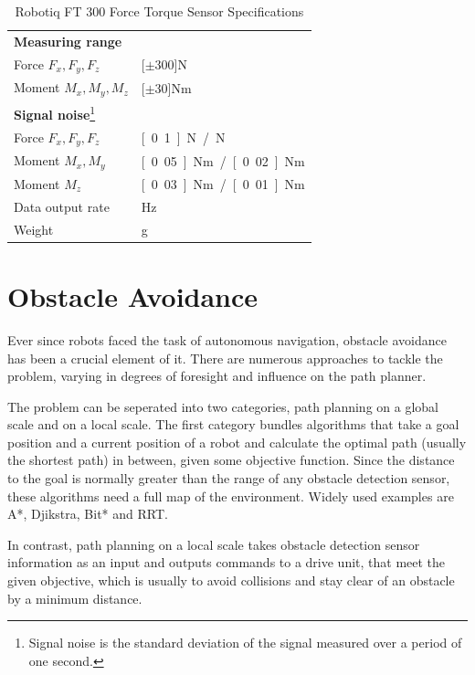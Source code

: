 \begin{savenotes}
\begin{table}[h]
\begin{center}
 \caption{Robotiq FT 300 Force Torque Sensor Specifications}\vspace{1ex}
 \label{tab:robotiq_ft}
 \begin{tabular}{ll}
 \hline
 \textbf{Measuring range} & \\
 Force $F_x, F_y, F_z$ & \unit[$\pm 300$]{N} \\
 Moment $M_x, M_y, M_z$ & \unit[$\pm 30$]{Nm} \\ \hline
 \textbf{Signal noise}\footnote{Signal noise is the standard deviation of the signal measured over a period of one second.} &\\
 Force $F_x, F_y, F_z$ & \unit[0.1]{N} / \unit[1]{N} \\
 Moment $M_x, M_y$ & \unit[0.05]{Nm} / \unit[0.02]{Nm} \\
 Moment $M_z$ & \unit[0.03]{Nm} / \unit[0.01]{Nm} \\ \hline
 Data output rate & \unit[100]{Hz} \\
 Weight & \unit[300]{g}\\
 \hline
 \end{tabular}
\end{center}
\end{table}
\end{savenotes}


\chapter{Obstacle Avoidance}
Ever since robots faced the task of autonomous navigation, obstacle avoidance has been a crucial element of it. There are numerous approaches to tackle the problem, varying in degrees of foresight and influence on the path planner.

The problem can be seperated into two categories, path planning on a global scale and on a local scale. The first category bundles algorithms that take a goal position and a current position of a robot and calculate the optimal path (usually the shortest path) in between, given some objective function. Since the distance to the goal is normally greater than the range of any obstacle detection sensor, these algorithms need a full map of the environment. Widely used examples are A*, Djikstra, Bit* and RRT.

In contrast, path planning on a local scale takes obstacle detection sensor information as an input and outputs commands to a drive unit, that meet the given objective, which is usually to avoid collisions and stay clear of an obstacle by a minimum distance. 

